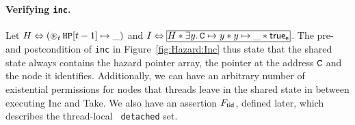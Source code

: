 
\paragraph{Verifying {\tt inc}.} Let $H \Leftrightarrow
(\mathop{\circledast}\limits\nolimits_{t} \texttt{HP}[t-1] \mapsto \_)$ and $I \Leftrightarrow \shareds{H *
  \exists y.\, \cc \mapsto y * y \mapsto \_ * \true_\se}$.  The pre- and
postcondition of \texttt{inc} in Figure~\ref{fig:Hazard:Inc} thus state that
the shared state always contains the hazard pointer array, the pointer at the
address $\texttt{C}$ and the node it identifies. Additionally, we can have an arbitrary
number of existential permissions for nodes that threads leave in the shared
state in between executing \textsf{Inc} and \textsf{Take}. We also have an
assertion $F_{{\sf tid}}$, defined later, which describes the thread-local {\tt
  detached} set.

